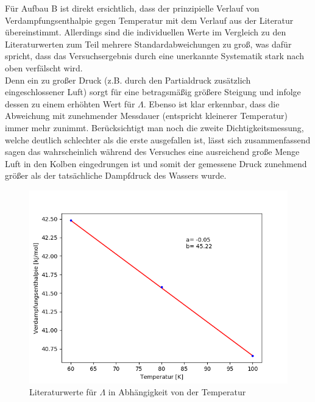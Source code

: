 \documentclass[12pt,a4paper]{article}
\begin{document}
Für Aufbau B ist direkt ersichtlich, dass der prinzipielle Verlauf von Verdampfungsenthalpie gegen Temperatur mit dem Verlauf aus der Literatur übereinstimmt. Allerdings sind die individuellen Werte im Vergleich zu den Literaturwerten zum Teil mehrere Standardabweichungen zu groß, was dafür spricht, dass das Versuchsergebnis durch eine unerkannte Systematik stark nach oben verfälscht wird.\\
Denn ein zu großer Druck (z.B. durch den Partialdruck zusätzlich eingeschlossener Luft) sorgt für eine betragsmäßig größere Steigung und infolge dessen zu einem erhöhten Wert für $\Lambda$.
Ebenso ist klar erkennbar, dass die Abweichung mit zunehmender Messdauer (entspricht kleinerer Temperatur) immer mehr zunimmt. Berücksichtigt man noch die zweite Dichtigkeitsmessung, welche deutlich schlechter als die erste ausgefallen ist, lässt sich zusammenfassend sagen das wahrscheinlich während des Versuches eine ausreichend große Menge Luft in den Kolben eingedrungen ist und somit der gemessene Druck zunehmend größer als der tatsächliche Dampfdruck des Wassers wurde.



\begin{figure}[H]
\begin{center}
\includegraphics[scale=0.9]{Bilder/Lambda_Literaturwert_fit.png}
\caption[Literaturwerte für $\Lambda$ in Abhängigkeit von der Temperatur]{Literaturwerte für $\Lambda$ in Abhängigkeit von der Temperatur}
\label{fig:LiteraturwertLambda}
\end{center}
\end{figure}
\end{document}
